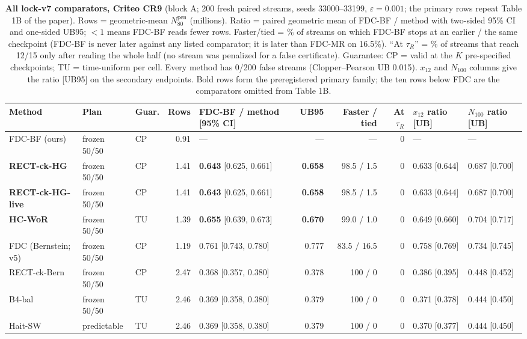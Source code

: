 \documentclass[sigconf,anonymous,review]{acmart}
\newcommand{\eps}{\varepsilon}
\newcommand{\Npen}{N_{80}^{\text{pen}}}
\begin{document}
\begin{table}[t]
\caption{\textbf{All lock-v7 comparators, Criteo CR9} (block A; 200 fresh paired streams, seeds 33000--33199, $\eps = 0.001$; the primary rows repeat Table 1B of the paper). Rows = geometric-mean $\Npen$ (millions). Ratio = paired geometric mean of FDC-BF / method with two-sided 95\% CI and one-sided UB95; $<1$ means FDC-BF reads fewer rows. Faster/tied = \% of streams on which FDC-BF stops at an earlier / the same checkpoint (FDC-BF is never later against any listed comparator; it is later than FDC-MR on 16.5\%). ``At $\tau_R$'' = \% of streams that reach 12/15 only after reading the whole half (no stream was penalized for a false certificate). Guarantee: CP = valid at the $K$ pre-specified checkpoints; TU = time-uniform per cell. Every method has 0/200 false streams (Clopper--Pearson UB 0.015). $x_{12}$ and $N_{100}$ columns give the ratio [UB95] on the secondary endpoints. Bold rows form the preregistered primary family; the ten rows below FDC are the comparators omitted from Table 1B.}
\label{tab:fullv7}
\small
\setlength{\tabcolsep}{3.4pt}
\begin{tabular}{@{}lllrlrrrll@{}}
\toprule
Method & Plan & Guar. & Rows & FDC-BF / method [95\% CI] & UB95 & Faster / tied & At $\tau_R$ & $x_{12}$ ratio [UB] & $N_{100}$ ratio [UB] \\
\midrule
FDC-BF (ours) & frozen 50/50 & CP & 0.91 & --- & --- & --- & 0 & --- & --- \\
\textbf{RECT-ck-HG} & frozen 50/50 & CP & 1.41 & \textbf{0.643} [0.625, 0.661] & \textbf{0.658} & 98.5 / 1.5 & 0 & 0.633 [0.644] & 0.687 [0.700] \\
\textbf{RECT-ck-HG-live} & frozen 50/50 & CP & 1.41 & \textbf{0.643} [0.625, 0.661] & \textbf{0.658} & 98.5 / 1.5 & 0 & 0.633 [0.644] & 0.687 [0.700] \\
\textbf{HC-WoR} & frozen 50/50 & TU & 1.39 & \textbf{0.655} [0.639, 0.673] & \textbf{0.670} & 99.0 / 1.0 & 0 & 0.649 [0.660] & 0.704 [0.717] \\
FDC (Bernstein; v5) & frozen 50/50 & CP & 1.19 & 0.761 [0.743, 0.780] & 0.777 & 83.5 / 16.5 & 0 & 0.758 [0.769] & 0.734 [0.745] \\
RECT-ck-Bern & frozen 50/50 & CP & 2.47 & 0.368 [0.357, 0.380] & 0.378 & 100 / 0 & 0 & 0.386 [0.395] & 0.448 [0.452] \\
B4-bal & frozen 50/50 & TU & 2.46 & 0.369 [0.358, 0.380] & 0.379 & 100 / 0 & 0 & 0.371 [0.378] & 0.444 [0.450] \\
Hait-SW & predictable & TU & 2.46 & 0.369 [0.358, 0.380] & 0.379 & 100 / 0 & 0 & 0.370 [0.377] & 0.444 [0.450] \\

\end{tabular}
\end{table}
\end{document}
